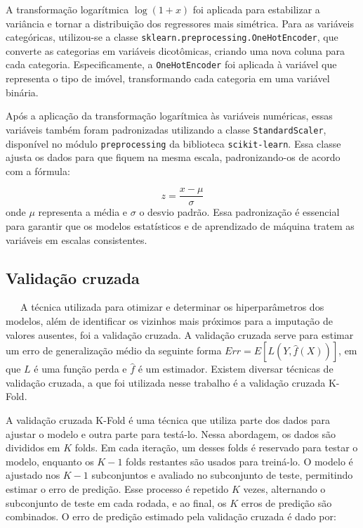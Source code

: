 \documentclass[
  12pt,
  a4paper,
]{scrreprt}
\begin{document}
\vspace{12pt}

A transformação logarítmica \(\log(1 + x)\) foi aplicada para
estabilizar a variância e tornar a distribuição dos regressores mais
simétrica. Para as variáveis categóricas, utilizou-se a classe
\texttt{sklearn.preprocessing.OneHotEncoder}, que converte as categorias
em variáveis dicotômicas, criando uma nova coluna para cada categoria.
Especificamente, a \texttt{OneHotEncoder} foi aplicada à variável que
representa o tipo de imóvel, transformando cada categoria em uma
variável binária.

\vspace{12pt}

Após a aplicação da transformação logarítmica às variáveis numéricas,
essas variáveis também foram padronizadas utilizando a classe
\texttt{StandardScaler}, disponível no módulo \texttt{preprocessing} da
biblioteca \texttt{scikit-learn}. Essa classe ajusta os dados para que
fiquem na mesma escala, padronizando-os de acordo com a fórmula:

\[
z = \frac{x - \mu}{\sigma}
\] onde \(\mu\) representa a média e \(\sigma\) o desvio padrão. Essa
padronização é essencial para garantir que os modelos estatísticos e de
aprendizado de máquina tratem as variáveis em escalas consistentes.

\subsection{Validação cruzada}\label{validauxe7uxe3o-cruzada}

~~~A técnica utilizada para otimizar e determinar os hiperparâmetros dos
modelos, além de identificar os vizinhos mais próximos para a imputação
de valores ausentes, foi a validação cruzada. A validação cruzada serve
para estimar um erro de generalização médio da seguinte forma
\(Err = E\left[L\left(Y, \hat{f}\left(X\right)\right)\right]\), em que
\(L\) é uma função perda e \(\hat f\) é um estimador. Existem diversar
técnicas de validação cruzada, a que foi utilizada nesse trabalho é a
validação cruzada K-Fold.

\vspace{12pt}

A validação cruzada K-Fold é uma técnica que utiliza parte dos dados
para ajustar o modelo e outra parte para testá-lo. Nessa abordagem, os
dados são divididos em \(K\) folds. Em cada iteração, um desses folds é
reservado para testar o modelo, enquanto os \(K−1\) folds restantes são
usados para treiná-lo. O modelo é ajustado nos \(K−1\) subconjuntos e
avaliado no subconjunto de teste, permitindo estimar o erro de predição.
Esse processo é repetido \(K\) vezes, alternando o subconjunto de teste
em cada rodada, e ao final, os \(K\) erros de predição são combinados. O
erro de predição estimado pela validação cruzada é dado por:
\end{document}
